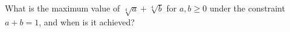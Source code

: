 What is the maximum value of $\sqrt[4]{a} + \sqrt[4]{b}$ for $a, b \geq 0$ under the constraint $a + b = 1$,
and when is it achieved?
